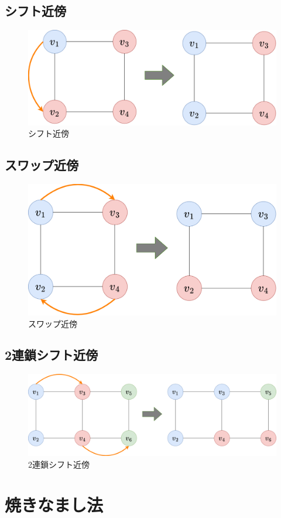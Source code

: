 \subsection{シフト近傍}

\begin{figure}[htbp]
  \centering
  \includegraphics[scale=0.2]{img/shift-neighbor.png}
  \caption{シフト近傍}
  \label{shift-neighbor}
\end{figure}

\subsection{スワップ近傍}

\begin{figure}[htbp]
  \centering
  \includegraphics[scale=0.2]{img/swap-neighbor.png}
  \caption{スワップ近傍}
  \label{swap-neighbor}
\end{figure}

\subsection{2連鎖シフト近傍}

\begin{figure}[htbp]
  \centering
  \includegraphics[scale=0.2]{img/chain-neighbor.png}
  \caption{2連鎖シフト近傍}
  \label{chain-neighbor}
\end{figure}

\section{焼きなまし法}

